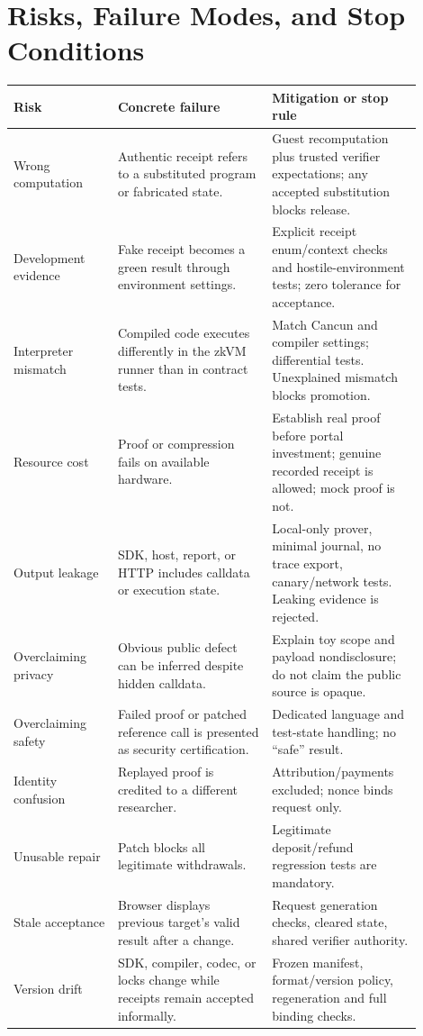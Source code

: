 \documentclass[11pt]{article}
\begin{document}
\section{Risks, Failure Modes, and Stop Conditions}
\begin{longtable}{L{0.23\linewidth}L{0.34\linewidth}L{0.33\linewidth}}
\toprule
\textbf{Risk} & \textbf{Concrete failure} & \textbf{Mitigation or stop rule} \\
\midrule
\endhead
Wrong computation & Authentic receipt refers to a substituted program or fabricated state. & Guest recomputation plus trusted verifier expectations; any accepted substitution blocks release. \\
Development evidence & Fake receipt becomes a green result through environment settings. & Explicit receipt enum/context checks and hostile-environment tests; zero tolerance for acceptance. \\
Interpreter mismatch & Compiled code executes differently in the zkVM runner than in contract tests. & Match Cancun and compiler settings; differential tests. Unexplained mismatch blocks promotion. \\
Resource cost & Proof or compression fails on available hardware. & Establish real proof before portal investment; genuine recorded receipt is allowed; mock proof is not. \\
Output leakage & SDK, host, report, or HTTP includes calldata or execution state. & Local-only prover, minimal journal, no trace export, canary/network tests. Leaking evidence is rejected. \\
Overclaiming privacy & Obvious public defect can be inferred despite hidden calldata. & Explain toy scope and payload nondisclosure; do not claim the public source is opaque. \\
Overclaiming safety & Failed proof or patched reference call is presented as security certification. & Dedicated language and test-state handling; no ``safe'' result. \\
Identity confusion & Replayed proof is credited to a different researcher. & Attribution/payments excluded; nonce binds request only. \\
Unusable repair & Patch blocks all legitimate withdrawals. & Legitimate deposit/refund regression tests are mandatory. \\
Stale acceptance & Browser displays previous target's valid result after a change. & Request generation checks, cleared state, shared verifier authority. \\
Version drift & SDK, compiler, codec, or locks change while receipts remain accepted informally. & Frozen manifest, format/version policy, regeneration and full binding checks. \\
\bottomrule
\end{longtable}
\end{document}
